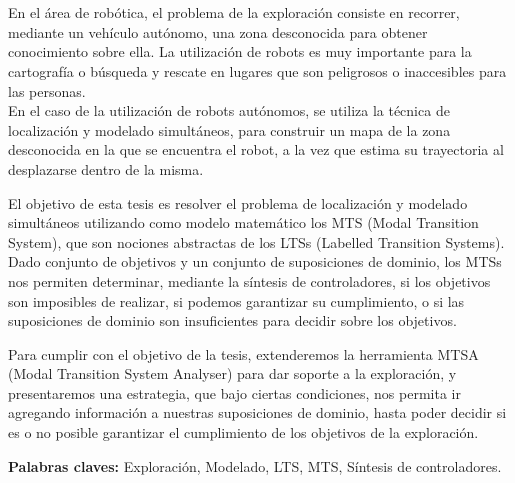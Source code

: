 \chapter*{\runtitulo}

\noindent
En el área de robótica, el problema de la exploración consiste en recorrer, mediante un vehículo autónomo,
una zona desconocida para obtener conocimiento sobre ella. La utilización de robots es muy importante para
la cartografía o búsqueda y rescate en lugares que son peligrosos o inaccesibles para las personas.\\
En el caso de la utilización de robots autónomos, se utiliza la técnica de localización y modelado simultáneos, 
para construir un mapa de la zona desconocida en la que se encuentra el robot, a la vez que estima su 
trayectoria al desplazarse dentro de la misma.

\vspace{\baselineskip}
El objetivo de esta tesis es resolver el problema de localización y modelado simultáneos utilizando como modelo 
matemático los MTS (Modal Transition System), que son nociones abstractas de los LTSs (Labelled Transition Systems).\\
Dado conjunto de objetivos y un conjunto de suposiciones de dominio, los MTSs nos permiten determinar, mediante la 
síntesis de controladores, si los objetivos son imposibles de realizar, si podemos garantizar su cumplimiento, o si 
las suposiciones de dominio son insuficientes para decidir sobre los objetivos.

\vspace{\baselineskip}
Para cumplir con el objetivo de la tesis, extenderemos la herramienta MTSA (Modal Transition System Analyser) para
dar soporte a la exploración, y presentaremos una estrategia, que bajo ciertas condiciones, nos permita ir agregando 
información a nuestras suposiciones de dominio, hasta poder decidir si es o no posible garantizar el cumplimiento de
los objetivos de la exploración.

\bigskip

\noindent\textbf{Palabras claves:} Exploración, Modelado, LTS, MTS, Síntesis de controladores.